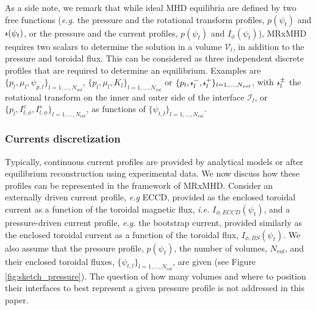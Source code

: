 \documentclass[my_thesis.tex]{subfiles}
\begin{document}
As a side note, we remark that while ideal \ac{MHD} equilibria are defined by two free functions (\textit{e.g.} the pressure and the rotational transform profiles, $p(\psi_t)$ and $\text{$\iota\!\!$-}(\psi_t)$, or the pressure and the current profiles, $p(\psi_t)$ and $I_\phi(\psi_t)$), \ac{MRxMHD} requires two scalars to determine the solution in a volume $\mathcal{V}_l$, in addition to the pressure and toroidal flux. This can be considered as three independent discrete profiles that are required to determine an equilibrium. Examples are $\{p_l, \mu_l, \psi_{p,l}\}_{l=1,\ldots,N_{vol}}$, $\{p_l, \mu_l, K_l\}_{l=1,\ldots,N_{vol}}$ or $\{p_l,\text{$\iota\!\!$-}^-_l,\text{$\iota\!\!$-}^+_l\}_{l=1,\ldots,N_{vol}}$, with $\text{$\iota\!\!$-}^\pm_l$ the rotational transform on the inner and outer side of the interface $\mathcal{I}_l$, or $\{p_l,I^v_{l,\phi},I^s_{l,\phi}\}_{l=1,\ldots,N_{vol}}$, as functions of $\{\psi_{t,l}\}_{l=1,\ldots,N_{vol}}$.


\subsubsection{Currents discretization}
Typically, continuous current profiles are provided by analytical models or after equilibrium reconstruction using experimental data. We now discuss how these profiles can be represented in the framework of \ac{MRxMHD}. Consider an externally driven current profile, \textit{e.g} \ac{ECCD}, provided as the enclosed toroidal current as a function of the toroidal magnetic flux, \textit{i.e.} $I_{\phi,ECCD}(\psi_t)$, and a pressure-driven current profile, \textit{e.g.} the bootstrap current, provided similarly as the enclosed toroidal current as a function of the toroidal flux, $I_{\phi,BS}(\psi_t)$. We also assume that the pressure profile, $p(\psi_t)$, the number of volumes, $N_{vol}$, and their enclosed toroidal fluxes, $\{\psi_{t,l}\}_{l=1,\ldots,N_{vol}}$, are given (see Figure \ref{fig:sketch_pressure}). The question of how many volumes and where to position their interfaces to best represent a given pressure profile is not addressed in this paper.
\end{document}
